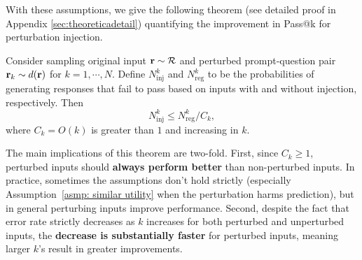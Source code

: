 With these assumptions, we give the following theorem (see detailed proof in Appendix \ref{sec:theoreticadetail}) quantifying the improvement in Pass@k for perturbation injection. 
\begin{theorem} \label{thm: main}
Consider sampling original input $\mathbf{r} \sim \mathcal{R}$ and perturbed prompt-question pair $\mathbf{r}_k \sim d(\mathbf{r})$ for $k = 1, \cdots, N$. Define $N_{\text{inj}}^k$ and $N_{\text{reg}}^k$
to be the probabilities of generating responses that fail to pass based on inputs with and without injection, respectively. Then 
$$ N_{\text{inj}}^k \leq N_{\text{reg}}^k / C_k, $$
where $C_k = O(k)$ is greater than $1$ and increasing in $k$. 
\end{theorem}

\begin{remark}
The main implications of this theorem are two-fold. First, since $C_k \geq 1$, perturbed inputs should \textbf{always perform better} than non-perturbed inputs. In practice, sometimes the assumptions don't hold strictly (especially Assumption~\ref{asmp: similar utility} when the perturbation harms prediction), but in general perturbing inputs improve performance. Second, despite the fact that error rate strictly decreases as $k$ increases for both perturbed and unperturbed inputs, the \textbf{decrease is substantially faster} for perturbed inputs, meaning larger $k$'s result in greater improvements. 
\end{remark}